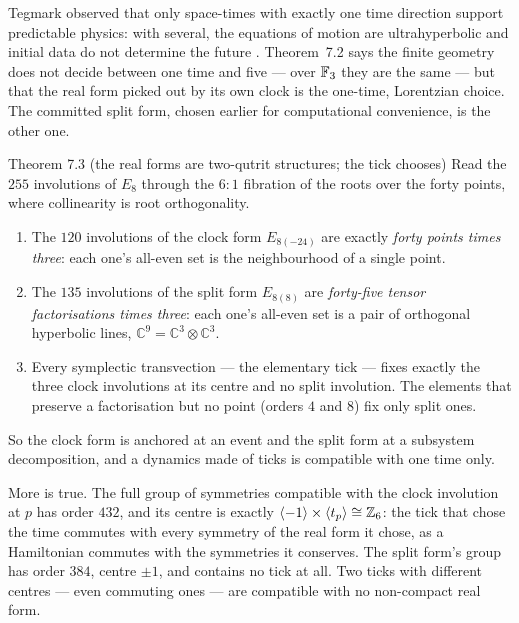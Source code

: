 \begin{physical}
Tegmark observed that only space-times with exactly one time direction support
predictable physics: with several, the equations of motion are ultrahyperbolic and
initial data do not determine the future \cite{Tegmark1997}. Theorem~7.2 says the finite
geometry does not decide between one time and five --- over $\mathbb{F}_3$ they are the same ---
but that the real form picked out by its own clock is the one-time, Lorentzian choice. The
committed split form, chosen earlier for computational convenience, is the other one.
\tierB
\end{physical}

\begin{result}{Theorem 7.3 (the real forms are two-qutrit structures; the tick chooses) \hfill \tierC}
Read the $255$ involutions of $E_8$ through the $6{:}1$ fibration of the roots over the forty points, where
collinearity is root orthogonality.
\begin{enumerate}
\item The $120$ involutions of the clock form $E_{8(-24)}$ are exactly \emph{forty points times three}: each one's
      all-even set is the neighbourhood of a single point.
\item The $135$ involutions of the split form $E_{8(8)}$ are \emph{forty-five tensor factorisations times three}:
      each one's all-even set is a pair of orthogonal hyperbolic lines, $\mathbb C^9=\mathbb C^3\otimes\mathbb C^3$.
\item Every symplectic transvection --- the elementary tick --- fixes exactly the three clock involutions at its
      centre and no split involution. The elements that preserve a factorisation but no point (orders $4$ and $8$)
      fix only split ones.
\end{enumerate}
So the clock form is anchored at an event and the split form at a subsystem decomposition, and a dynamics made
of ticks is compatible with one time only. 
\end{result}

More is true. The full group of symmetries compatible with the clock involution at $p$ has order $432$, and its centre is exactly $\langle -1\rangle\times\langle t_p\rangle\cong\mathbb{Z}_6$: the tick that chose the time commutes with every symmetry of the real form it chose, as a Hamiltonian commutes with the symmetries it conserves. The split form's group has order $384$, centre $\pm1$, and contains no tick at all. Two ticks with different centres --- even commuting ones --- are compatible with no non-compact real form. 

